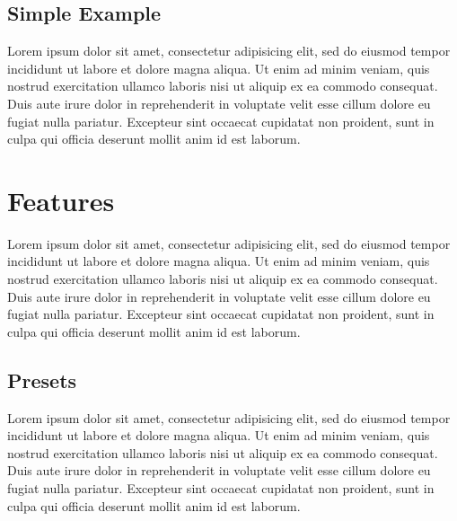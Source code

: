 \documentclass{article}
\begin{document}
\subsection{Simple Example}
Lorem ipsum dolor sit amet, consectetur adipisicing elit, sed do eiusmod
tempor incididunt ut labore et dolore magna aliqua. Ut enim ad minim veniam,
quis nostrud exercitation ullamco laboris nisi ut aliquip ex ea commodo
consequat. Duis aute irure dolor in reprehenderit in voluptate velit esse
cillum dolore eu fugiat nulla pariatur. Excepteur sint occaecat cupidatat non
proident, sunt in culpa qui officia deserunt mollit anim id est laborum.
\section{Features}
Lorem ipsum dolor sit amet, consectetur adipisicing elit, sed do eiusmod
tempor incididunt ut labore et dolore magna aliqua. Ut enim ad minim veniam,
quis nostrud exercitation ullamco laboris nisi ut aliquip ex ea commodo
consequat. Duis aute irure dolor in reprehenderit in voluptate velit esse
cillum dolore eu fugiat nulla pariatur. Excepteur sint occaecat cupidatat non
proident, sunt in culpa qui officia deserunt mollit anim id est laborum.
\subsection{Presets}
Lorem ipsum dolor sit amet, consectetur adipisicing elit, sed do eiusmod
tempor incididunt ut labore et dolore magna aliqua. Ut enim ad minim veniam,
quis nostrud exercitation ullamco laboris nisi ut aliquip ex ea commodo
consequat. Duis aute irure dolor in reprehenderit in voluptate velit esse
cillum dolore eu fugiat nulla pariatur. Excepteur sint occaecat cupidatat non
proident, sunt in culpa qui officia deserunt mollit anim id est laborum.
\end{document}
